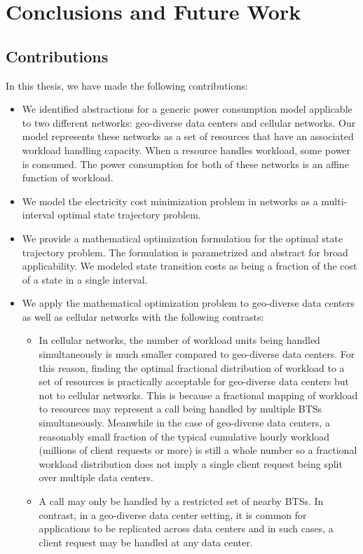 \chapter{Conclusions and Future Work}
\label{chap:conclusions}
\section{Contributions} In this thesis, we have made the following contributions:
\begin{itemize}
\item We identified abstractions for a generic power consumption model applicable to two different networks: geo-diverse data centers and cellular networks. Our model represents these networks as a set of resources that have an associated workload handling capacity. When a resource handles workload, some power is consumed. The power consumption for both of these networks is an affine function of workload. 
\item We model the electricity cost minimization problem in networks as a multi-interval optimal state trajectory problem.
\item We provide a mathematical optimization formulation for the optimal state trajectory problem. The formulation is parametrized and abstract for broad applicability. We modeled state transition costs as being a fraction of the cost of a state in a single interval.
\item We apply the mathematical optimization problem to geo-diverse data centers as well as cellular networks with the following contrasts:
	\begin{itemize}
	\item In cellular networks, the number of workload units being handled simultaneously is much smaller compared to geo-diverse data centers. For this reason, finding the optimal fractional distribution of workload to a set of resources is practically acceptable for geo-diverse data centers but not to cellular networks. This is because a fractional mapping of workload to resources may represent a call being handled by multiple BTSs simultaneously. Meanwhile in the case of geo-diverse data centers, a reasonably small fraction of the typical cumulative hourly workload (millions of client requests or more) is still a whole number so a fractional workload distribution does not imply a single client request being split over multiple data centers.
	\item A call may only be handled by a restricted set of nearby BTSs. In contrast, in a geo-diverse data center setting, it is common for applications to be replicated across data centers and in such cases, a client request may be handled at any data center.

\end{itemize}
\end{itemize}
